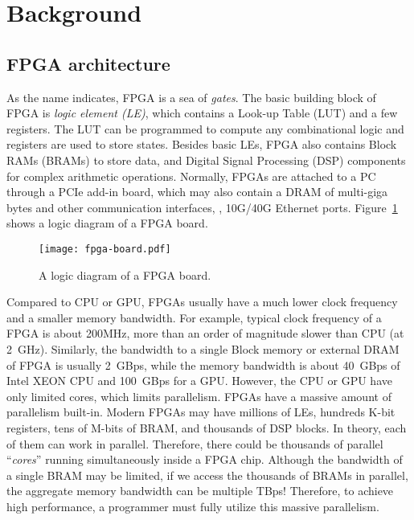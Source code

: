 \section{Background}
\label{clicknp:sec:background}

\subsection{FPGA architecture}
\label{clicknp:subsec:fpga}

As the name indicates, FPGA is a sea of \textit{gates}. 
The basic building block of FPGA is \textit{logic element (LE)},
which contains a Look-up Table (LUT) and a few registers. 
The LUT can be programmed to compute any combinational logic 
and registers are used to store states. 
%
Besides basic LEs, FPGA also contains Block RAMs (BRAMs) to store data, 
and Digital Signal Processing (DSP) components for complex arithmetic operations.
%
Normally, FPGAs are attached to a PC through a PCIe add-in board, which
may also contain a DRAM of multi-giga bytes and other communication
interfaces, \eg, 10G/40G Ethernet ports. 
Figure~\ref{clicknp:fig:fpga} shows a logic diagram of a FPGA board.

\begin{figure}[t]
\centering
\texttt{[image: fpga-board.pdf]}

\caption{A logic diagram of a FPGA board.}
\label{clicknp:fig:fpga}

\end{figure}

%
%

Compared to CPU or GPU, FPGAs usually have a much lower clock frequency
and a smaller memory bandwidth.
For example, typical clock frequency of a FPGA is about 200MHz, 
more than an order of magnitude slower than CPU (at 2~GHz). 
Similarly, the bandwidth to a single Block memory or external DRAM of FPGA 
is usually 2~GBps, while the memory bandwidth
is about 40~GBps of Intel XEON CPU and 100~GBps for a GPU. 
%
However, the CPU or GPU have only limited cores, which limits parallelism.
FPGAs have a massive amount of parallelism built-in. 
Modern FPGAs may have millions of LEs, hundreds K-bit registers, tens of M-bits of BRAM, 
and thousands 
of DSP blocks. In theory, each of them can work in parallel. 
Therefore, there could be thousands of parallel ``\textit{cores}'' 
running simultaneously inside a FPGA chip. 
Although the bandwidth of a single BRAM may be limited, if we access the  
thousands of BRAMs in parallel, the aggregate memory bandwidth can be multiple TBps! 
%
Therefore, to achieve high performance, a programmer
must fully utilize this massive parallelism.

